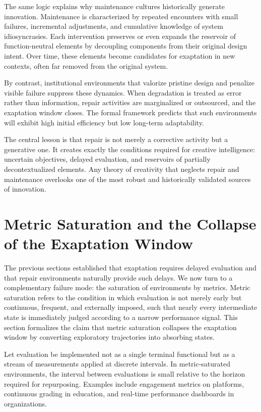 \documentclass[11pt]{article}
\theoremstyle{definition}
\begin{document}
The same logic explains why maintenance cultures historically generate innovation. Maintenance is characterized by repeated encounters with small failures, incremental adjustments, and cumulative knowledge of system idiosyncrasies. Each intervention preserves or even expands the reservoir of function-neutral elements by decoupling components from their original design intent. Over time, these elements become candidates for exaptation in new contexts, often far removed from the original system.

By contrast, institutional environments that valorize pristine design and penalize visible failure suppress these dynamics. When degradation is treated as error rather than information, repair activities are marginalized or outsourced, and the exaptation window closes. The formal framework predicts that such environments will exhibit high initial efficiency but low long-term adaptability.

The central lesson is that repair is not merely a corrective activity but a generative one. It creates exactly the conditions required for creative intelligence: uncertain objectives, delayed evaluation, and reservoirs of partially decontextualized elements. Any theory of creativity that neglects repair and maintenance overlooks one of the most robust and historically validated sources of innovation.

\section{Metric Saturation and the Collapse of the Exaptation Window}

The previous sections established that exaptation requires delayed evaluation and that repair environments naturally provide such delays. We now turn to a complementary failure mode: the saturation of environments by metrics. Metric saturation refers to the condition in which evaluation is not merely early but continuous, frequent, and externally imposed, such that nearly every intermediate state is immediately judged according to a narrow performance signal. This section formalizes the claim that metric saturation collapses the exaptation window by converting exploratory trajectories into absorbing states.

Let evaluation be implemented not as a single terminal functional but as a stream of measurements applied at discrete intervals. In metric-saturated environments, the interval between evaluations is small relative to the horizon required for repurposing. Examples include engagement metrics on platforms, continuous grading in education, and real-time performance dashboards in organizations.
\end{document}
